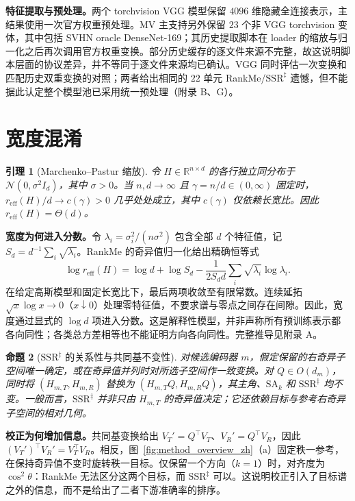 \documentclass{article}
\newcommand{\reff}{\ensuremath{r_{\mathrm{eff}}}\xspace}
\newcommand{\SAk}{\ensuremath{\mathrm{SA}_k}\xspace}
\newcommand{\SSRdag}{\ensuremath{\mathrm{SSR}^{\ddagger}}\xspace}
\newtheorem{lemma}{引理}
\newtheorem{proposition}[lemma]{命题}
\begin{document}
\textbf{特征提取与预处理。}两个 torchvision VGG 模型保留 $4096$ 维隐藏全连接表示，主结果使用一次官方权重预处理。MV 主支持另外保留 $23$ 个非 VGG torchvision 变体，其中包括 SVHN oracle DenseNet-169；其历史提取脚本在 loader 的缩放与归一化之后再次调用官方权重变换。部分历史缓存的逐文件来源不完整，故这说明脚本层面的协议差异，并不等同于逐文件来源均已确认。VGG 同时评估一次变换和匹配历史双重变换的对照；两者给出相同的 $22$ 单元 RankMe/\SSRdag 遗憾，但不能据此认定整个模型池已采用统一预处理（附录 B、G）。

\section{宽度混淆}
\begin{lemma}[Marchenko--Pastur 缩放]
\label{lem:mp_zh}
令 $H\in\mathbb{R}^{n\times d}$ 的各行独立同分布于 $\mathcal N(0,\sigma^2I_d)$，其中 $\sigma>0$。当 $n,d\to\infty$ 且 $\gamma=n/d\in(0,\infty)$ 固定时，$\reff(H)/d\to c(\gamma)>0$ 几乎处处成立，其中 $c(\gamma)$ 仅依赖长宽比。因此 $\reff(H)=\Theta(d)$。
\end{lemma}

\textbf{宽度为何进入分数。}令 $\lambda_i=\sigma_i^2/(n\sigma^2)$ 包含全部 $d$ 个特征值，记 $S_d=d^{-1}\sum_i\sqrt{\lambda_i}$。RankMe 的奇异值归一化给出精确恒等式
\[
 \log\reff(H)=\log d+\log S_d
 -\frac{1}{2S_d d}\sum_i\sqrt{\lambda_i}\log\lambda_i.
\]
在给定高斯模型和固定长宽比下，最后两项收敛至有限常数。连续延拓 $\sqrt{x}\log x\to0$（$x\downarrow0$）处理零特征值，不要求谱与零点之间存在间隙。因此，宽度通过显式的 $\log d$ 项进入分数。这是解释性模型，并非声称所有预训练表示都各向同性；各类总方差相等也不能证明方向各向同性。完整推导见附录 A。

\begin{proposition}[\SSRdag 的关系性与共同基不变性]
\label{prop:nonrot_zh}
对候选编码器 $m$，假定保留的右奇异子空间唯一确定，或在奇异值并列时对所选子空间作一致变换。对 $Q\in O(d_m)$，同时将 $(H_{m,T},H_{m,R})$ 替换为 $(H_{m,T}Q,H_{m,R}Q)$，其主角、$\SAk$ 和 \SSRdag 均不变。一般而言，\SSRdag 并非只由 $H_{m,T}$ 的奇异值决定；它还依赖目标与参考右奇异子空间的相对几何。
\end{proposition}

\textbf{校正为何增加信息。}共同基变换给出 $V_T'=Q^\top V_T$、$V_R'=Q^\top V_R$，因此 $(V_T')^\top V_R'=V_T^\top V_R$。相反，图~\ref{fig:method_overview_zh}（a）固定秩一参考，在保持奇异值不变时旋转秩一目标。仅保留一个方向（$k=1$）时，对齐度为 $\cos^2\theta$：RankMe 无法区分这两个目标，而 \SSRdag 可以。这说明校正引入了目标谱之外的信息，而不是给出了二者下游准确率的排序。
\end{document}
